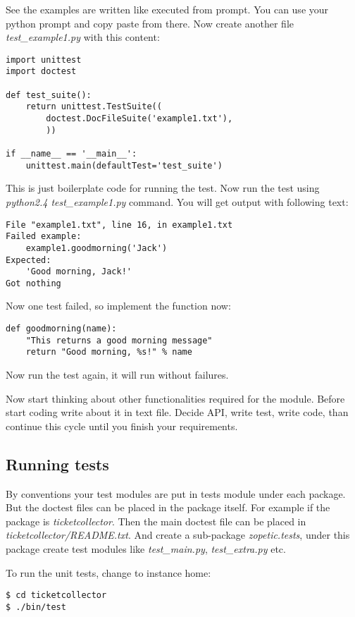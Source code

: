 See the examples are written like executed from prompt.  You can use
your python prompt and copy paste from there.  Now create another file
\emph{test\_example1.py} with this content:

{\footnotesize
\begin{verbatim}
import unittest
import doctest

def test_suite():
    return unittest.TestSuite((
        doctest.DocFileSuite('example1.txt'),
        ))

if __name__ == '__main__':
    unittest.main(defaultTest='test_suite')
\end{verbatim}
}

This is just boilerplate code for running the test. Now run the test
using \emph{python2.4 test\_example1.py} command. You will get output with
following text:

{\footnotesize
\begin{verbatim}
File "example1.txt", line 16, in example1.txt
Failed example:
    example1.goodmorning('Jack')
Expected:
    'Good morning, Jack!'
Got nothing
\end{verbatim}
}

Now one test failed, so implement the function now:

{\footnotesize
\begin{verbatim}
def goodmorning(name):
    "This returns a good morning message"
    return "Good morning, %s!" % name
\end{verbatim}
}

Now run the test again, it will run without failures.

Now start thinking about other functionalities required for the
module. Before start coding write about it in text file. Decide API,
write test, write code, than continue this cycle until you finish your
requirements.  

\subsection{Running tests}

By conventions your test modules are put in tests module under each
package.  But the doctest files can be placed in the package itself.
For example if the package is \emph{ticketcollector}.  Then the main
doctest file can be placed in \emph{ticketcollector/README.txt}.  And
create a sub-package \emph{zopetic.tests}, under this package create
test modules like \emph{test\_main.py}, \emph{test\_extra.py} etc.

To run the unit tests, change to instance home:

{\footnotesize
\begin{verbatim}
$ cd ticketcollector
$ ./bin/test
\end{verbatim}
}
